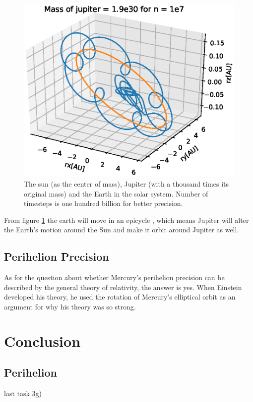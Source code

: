 \documentclass{article}
\begin{document}
\begin{figure}[H]
  \includegraphics[scale=0.5]{plots/Mass1000.eps}
  \caption{The sun (as the center of mass), Jupiter (with a thousand times its original mass) and the Earth in the solar system. Number of timesteps is one hundred billion for better precision.}
  \label{jupitermass1000}
\end{figure}

From figure \ref{jupitermass1000} the earth will move in an epicycle \cite{epicycle}, which means Jupiter will alter the Earth's motion around the Sun and make it orbit around Jupiter as well.

\subsection{Perihelion Precision}
\vskip0.5cm
As for the question about whether Mercury's perihelion precision can be described by the general theory of relativity, the answer is yes. When Einstein developed his theory, he used the rotation of Mercury's elliptical orbit as an argument for why his theory was so strong. \cite{wiki_rel}
\section{Conclusion}


\subsection{Perihelion}
last task 3g)
\end{document}
